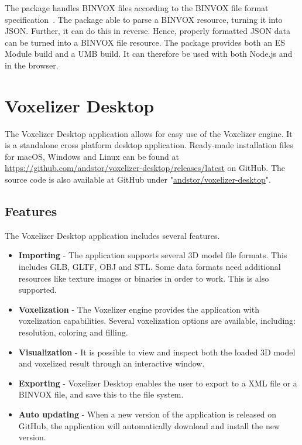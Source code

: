 The package handles BINVOX files according to the BINVOX file format specification~\cite{binvox-file-format}. The package able to parse a BINVOX resource, turning it into JSON. Further, it can do this in reverse. Hence, properly formatted JSON data can be turned into a BINVOX file resource. The package provides both an ES Module build and a UMB build. It can therefore be used with both Node.js and in the browser.

\section{Voxelizer Desktop}
The Voxelizer Desktop application allows for easy use of the Voxelizer engine. It is a standalone cross platform desktop application. Ready-made installation files for macOS, Windows and Linux can be found at \url{https://github.com/andstor/voxelizer-desktop/releases/latest} on GitHub. The source code is also available at GitHub under "\href{https://github.com/andstor/voxelizer-desktop}{andstor/voxelizer-desktop}".

\subsection{Features}
The Voxelizer Desktop application includes several features.
\begin{itemize}
    \item \textbf{Importing} - The application supports several 3D model file formats. This includes GLB, GLTF, OBJ and STL. Some data formats need additional resources like texture images or binaries in order to work. This is also supported.
    \item \textbf{Voxelization} - The Voxelizer engine provides the application with voxelization capabilities. Several voxelization options are available, including: resolution, coloring and filling.
    \item \textbf{Visualization} - It is possible to view and inspect both the loaded 3D model and voxelized result through an interactive window.
    \item \textbf{Exporting} - Voxelizer Desktop enables the user to export to a XML file or a BINVOX file, and save this to the file system.
    \item \textbf{Auto updating} - When a new version of the application is released on GitHub, the application will automatically download and install the new version.
\end{itemize}

